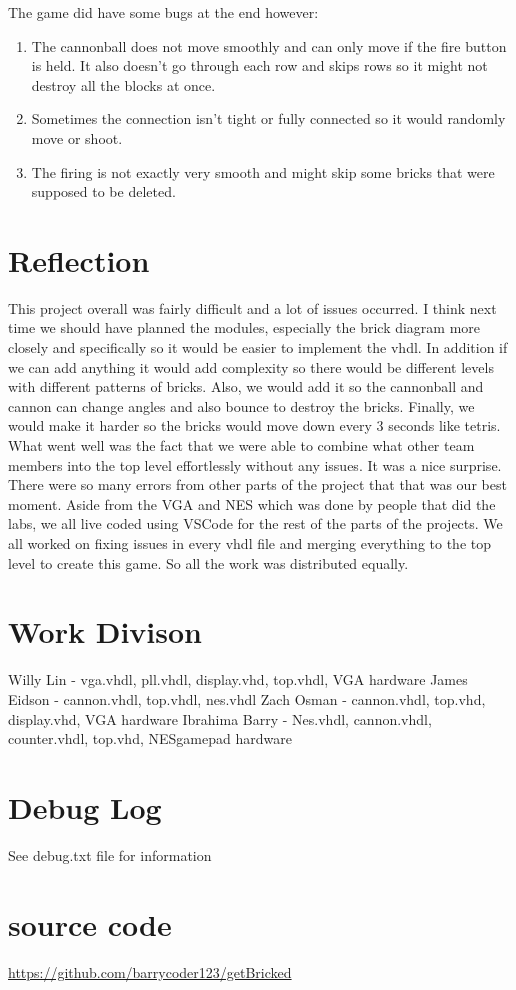 \documentclass[12pt]{article}
\begin{document}
\begin{flushleft}
The game did have some bugs at the end however:\\
\begin{enumerate}
    \item The cannonball does not move smoothly and can only move if the fire
button is held. It also doesn’t go through each row and skips rows so it might
not destroy all the blocks at once. 
    \item Sometimes the connection isn’t tight or fully connected so it would randomly move or shoot.
    \item The firing is not exactly very smooth and might skip some bricks that
were supposed to be deleted.
\end{enumerate}

\section{Reflection} 
This project overall was fairly difficult and a lot of issues occurred. I think
next time we should have planned the modules, especially the brick diagram more
closely and specifically so it would be easier to implement the vhdl. In
addition if we can add anything it would add complexity so there would be
different levels with different patterns of bricks. Also, we would add it so the
cannonball and cannon can change angles and also bounce to destroy the bricks.
Finally, we would make it harder so the bricks would move down every 3 seconds
like tetris. What went well was the fact that we were able to combine what other
team members into the top level effortlessly without any issues. It was a nice
surprise. There were so many errors from other parts of the project that that
was our best moment. Aside from the VGA and NES which was done by people that
did the labs, we all live coded using VSCode for the rest of the parts of the
projects. We all worked on fixing issues in every vhdl file and merging
everything to the top level to create this game. So all the work was distributed
equally.

\section{Work Divison} 
Willy Lin - vga.vhdl, pll.vhdl, display.vhd, top.vhdl, VGA hardware
James Eidson - cannon.vhdl, top.vhdl, nes.vhdl
Zach Osman - cannon.vhdl, top.vhd, display.vhd, VGA hardware
Ibrahima Barry - Nes.vhdl, cannon.vhdl, counter.vhdl, top.vhd, NESgamepad hardware
\section{Debug Log}
See debug.txt file for information
\section{source code}
\url{https://github.com/barrycoder123/getBricked}
\end{flushleft}
\end{document}
